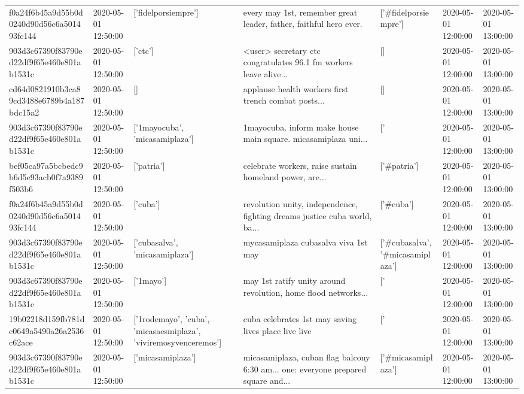 \begin{tabular}{lllllll}
f0a24f6b45a9d55b0d0240d90d56c6a501493fc144 & 2020-05-01 12:50:00 & ['fidelporsiempre'] & every may 1st, remember great leader, father, faithful hero ever. & ['#fidelporsiempre'] & 2020-05-01 12:00:00 & 2020-05-01 13:00:00 \\
903d3c67390f83790ed22df9f65e460e801ab1531c & 2020-05-01 12:50:00 & ['ctc'] & <user> secretary ctc congratulates 96.1 fm workers leave alive... & [] & 2020-05-01 12:00:00 & 2020-05-01 13:00:00 \\
cd64d0821910b3ca89cd3488e6789b4a187bdc15a2 & 2020-05-01 12:50:00 & [] & applause health workers first trench combat posts... & [] & 2020-05-01 12:00:00 & 2020-05-01 13:00:00 \\
903d3c67390f83790ed22df9f65e460e801ab1531c & 2020-05-01 12:50:00 & ['1mayocuba', 'micasamiplaza'] & 1mayocuba. inform make house main square. micasamiplaza uni... & ['#1mayocuba', '#micasamiplaza'] & 2020-05-01 12:00:00 & 2020-05-01 13:00:00 \\
bef05ca97a5bcbedc9b6d5e93acb0f7a9389f503b6 & 2020-05-01 12:50:00 & ['patria'] & celebrate workers, raise sustain homeland power, are... & ['#patria'] & 2020-05-01 12:00:00 & 2020-05-01 13:00:00 \\
f0a24f6b45a9d55b0d0240d90d56c6a501493fc144 & 2020-05-01 12:50:00 & ['cuba'] & revolution unity, independence, fighting dreams justice cuba world, ba... & ['#cuba'] & 2020-05-01 12:00:00 & 2020-05-01 13:00:00 \\
903d3c67390f83790ed22df9f65e460e801ab1531c & 2020-05-01 12:50:00 & ['cubasalva', 'micasamiplaza'] & mycasamiplaza cubasalva viva 1st may & ['#cubasalva', '#micasamiplaza'] & 2020-05-01 12:00:00 & 2020-05-01 13:00:00 \\
903d3c67390f83790ed22df9f65e460e801ab1531c & 2020-05-01 12:50:00 & ['1mayo'] & may 1st ratify unity around revolution, home flood networks... & ['#1mayo'] & 2020-05-01 12:00:00 & 2020-05-01 13:00:00 \\
19b02218d159fb781dc0649a5490a26a2536c62ace & 2020-05-01 12:50:00 & ['1rodemayo', 'cuba', 'micasaesmiplaza', 'viviremosyvenceremos'] & cuba celebrates 1st may saving lives place live live & ['#1rodemayo', '#cuba', '#micasaesmiplaza', '#viviremosyvenceremos'] & 2020-05-01 12:00:00 & 2020-05-01 13:00:00 \\
903d3c67390f83790ed22df9f65e460e801ab1531c & 2020-05-01 12:50:00 & ['micasamiplaza'] & micasamiplaza, cuban flag balcony 6:30 am... one: everyone prepared square and... & ['#micasamiplaza'] & 2020-05-01 12:00:00 & 2020-05-01 13:00:00 \\

\end{tabular}

